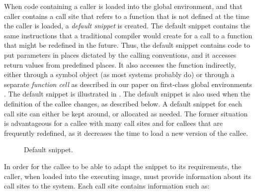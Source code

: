 When code containing a caller is loaded into the global environment,
and that caller contains a call site that refers to a function that is
not defined at the time the caller is loaded, a \emph{default snippet}
is created.  The default snippet contains the same instructions that a
traditional compiler would create for a call to a function that might
be redefined in the future.  Thus, the default snippet contains code
to put parameters in places dictated by the calling conventions, and
it accesses return values from predefined places.  It also accesses
the function indirectly, either through a symbol object (as most
\commonlisp{} systems probably do) or through a separate
\emph{function cell} as described in our paper on first-class global
environments \cite{Strandh:2015:ELS:Environments}.  The default
snippet is illustrated in .  The default
snippet is also used when the definition of the callee changes, as
described below.  A default snippet for each call site can either be
kept around, or allocated as needed.  The former situation is
advantageous for a callee with many call sites and for callees that
are frequently redefined, as it decreases the time to load a new
version of the callee.

\begin{figure}
\begin{center}
\end{center}
\caption{\label{fig-default-snippet}
Default snippet.}
\end{figure}

In order for the callee to be able to adapt the snippet to its
requirements, the caller, when loaded into the executing image, must
provide information about its call sites to the system.  Each call
site contains information such as:

